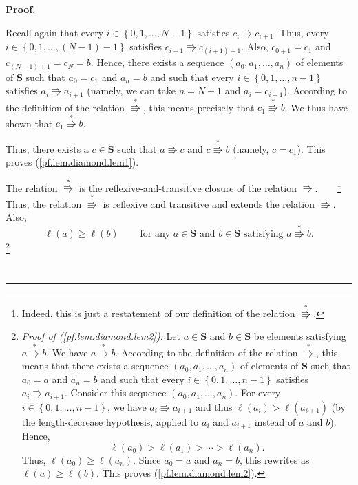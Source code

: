 \documentclass[numbers=enddot,12pt,final,onecolumn,notitlepage]{scrartcl}%
\theoremstyle{definition}
\newenvironment{proof}[1][Proof]{\noindent\textbf{#1.} }{\ \rule{0.5em}{0.5em}}
\newenvironment{verlong}{}{}
\begin{document}
\begin{verlong}
\begin{proof}
{\par
Recall again that every $i\in\left\{  0,1,\ldots,N-1\right\}  $ satisfies
$c_{i}\Rrightarrow c_{i+1}$. Thus, every $i\in\left\{  0,1,\ldots,\left(
N-1\right)  -1\right\}  $ satisfies $c_{i+1}\Rrightarrow c_{\left(
i+1\right)  +1}$. Also, $c_{0+1}=c_{1}$ and $c_{\left(  N-1\right)  +1}%
=c_{N}=b$. Hence, there exists a sequence $\left(  a_{0},a_{1},\ldots
,a_{n}\right)  $ of elements of $\mathbf{S}$ such that $a_{0}=c_{1}$ and
$a_{n}=b$ and such that every $i\in\left\{  0,1,\ldots,n-1\right\}  $
satisfies $a_{i}\Rrightarrow a_{i+1}$ (namely, we can take $n=N-1$ and
$a_{i}=c_{i+1}$). According to the definition of the relation $\overset{\ast
}{\Rrightarrow}$, this means precisely that $c_{1}\overset{\ast}{\Rrightarrow
}b$. We thus have shown that $c_{1}\overset{\ast}{\Rrightarrow}b$.
\par
Thus, there exists a $c\in\mathbf{S}$ such that $a\Rrightarrow c$ and
$c\overset{\ast}{\Rrightarrow}b$ (namely, $c=c_{1}$). This proves
(\ref{pf.lem.diamond.lem1}).}

The relation $\overset{\ast}{\Rrightarrow}$ is the reflexive-and-transitive
closure of the relation $\Rrightarrow$.\ \ \ \ \footnote{Indeed, this is just
a restatement of our definition of the relation $\overset{\ast}{\Rrightarrow}%
$.} Thus, the relation $\overset{\ast}{\Rrightarrow}$ is reflexive and
transitive and extends the relation $\Rrightarrow$. Also,%
\begin{equation}
\ell\left(  a\right)  \geq\ell\left(  b\right)  \ \ \ \ \ \ \ \ \ \ \text{for
any }a\in\mathbf{S}\text{ and }b\in\mathbf{S}\text{ satisfying }%
a\overset{\ast}{\Rrightarrow}b. \label{pf.lem.diamond.lem2}%
\end{equation}
\footnote{\textit{Proof of (\ref{pf.lem.diamond.lem2}):} Let $a\in\mathbf{S}$
and $b\in\mathbf{S}$ be elements satisfying $a\overset{\ast}{\Rrightarrow}b$.
We have $a\overset{\ast}{\Rrightarrow}b$. According to the definition of the
relation $\overset{\ast}{\Rrightarrow}$, this means that there exists a
sequence $\left(  a_{0},a_{1},\ldots,a_{n}\right)  $ of elements of
$\mathbf{S}$ such that $a_{0}=a$ and $a_{n}=b$ and such that every
$i\in\left\{  0,1,\ldots,n-1\right\}  $ satisfies $a_{i}\Rrightarrow a_{i+1}$.
Consider this sequence $\left(  a_{0},a_{1},\ldots,a_{n}\right)  $. For every
$i\in\left\{  0,1,\ldots,n-1\right\}  $, we have $a_{i}\Rrightarrow a_{i+1}$
and thus $\ell\left(  a_{i}\right)  >\ell\left(  a_{i+1}\right)  $ (by the
length-decrease hypothesis, applied to $a_{i}$ and $a_{i+1}$ instead of $a$
and $b$). Hence,%
\[
\ell\left(  a_{0}\right)  >\ell\left(  a_{1}\right)  >\cdots>\ell\left(
a_{n}\right)  .
\]
Thus, $\ell\left(  a_{0}\right)  \geq\ell\left(  a_{n}\right)  $. Since
$a_{0}=a$ and $a_{n}=b$, this rewrites as $\ell\left(  a\right)  \geq
\ell\left(  b\right)  $. This proves (\ref{pf.lem.diamond.lem2}).}


\end{proof}
\end{verlong}
\end{document}
